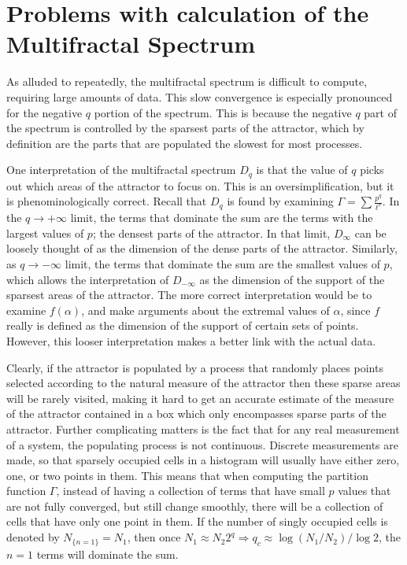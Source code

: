 \section{Problems with calculation of the Multifractal Spectrum}

As alluded to repeatedly, the multifractal spectrum is difficult to compute, requiring large amounts of data.  This slow convergence is especially pronounced for the negative $q$ portion of the spectrum.  This is because the negative $q$ part of the spectrum is controlled by the sparsest parts of the attractor, which by definition are the parts that are populated the slowest for most processes.

One interpretation of the multifractal spectrum $D_q$ is that the value of $q$ picks out which areas of the attractor to focus on.  This is an oversimplification, but it is phenominologically correct.  Recall that $D_q$ is found by examining $\Gamma=\sum\frac{p^q}{\ell^\tau}$.  In the $q\to+\infty$ limit, the terms that dominate the sum are the terms with the largest values of $p$; the densest parts of the attractor.  In that limit, $D_\infty$ can be loosely thought of as the dimension of the dense parts of the attractor.  Similarly, as $q\to-\infty$ limit, the terms that dominate the sum are the smallest values of $p$, which allows the interpretation of $D_{-\infty}$ as the dimension of the support of the sparsest areas of the attractor.  The more correct interpretation would be to examine $f(\alpha)$, and make arguments about the extremal values of $\alpha$, since $f$ really is defined as the dimension of the support of certain sets of points.  However, this looser interpretation makes a better link with the actual data.

Clearly, if the attractor is populated by a process that randomly places points selected according to the natural measure of the attractor %
then these sparse areas will be rarely visited, making it hard to get an accurate estimate of the measure of the attractor contained in a box which only encompasses sparse parts of the attractor.  Further complicating matters is the fact that for any real measurement of a system, the populating process is not continuous.  Discrete measurements are made, so that sparsely occupied cells in a histogram will usually have either zero, one, or two points in them.  This means that when computing the partition function $\Gamma$, instead of having a collection of terms that have small $p$ values that are not fully converged, but still change smoothly, there will be a collection of cells that have only one point in them.  If the number of singly occupied cells is denoted by $N_{\{n=1\}}=N_1$, then once $N_1 \approx N_2 2^q \Rightarrow q_c \approx \log (N_1/N_2) / \log 2$, the $n=1$ terms will dominate the sum.  

